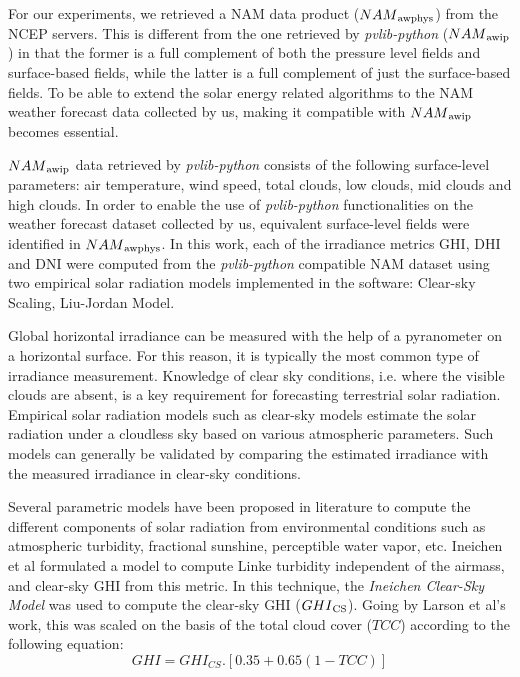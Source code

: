 \par For our experiments, we retrieved a NAM data product ($NAM\textsubscript{awphys}$) from the NCEP servers. This is different from the one retrieved by \textit{pvlib-python} ($NAM\textsubscript{awip}$) in that the former is a full complement of both the pressure level fields and surface-based fields, while the latter is a full complement of just the surface-based fields. To be able to extend the solar energy related algorithms to the NAM weather forecast data collected by us, making it compatible with $NAM\textsubscript{awip}$ becomes essential.

\par $NAM\textsubscript{awip}$ data retrieved by \textit{pvlib-python} consists of the following surface-level parameters: air temperature, wind speed, total clouds, low clouds, mid clouds and high clouds. In order to enable the use of \textit{pvlib-python} functionalities on the weather forecast dataset collected by us, equivalent surface-level fields were identified in $NAM\textsubscript{awphys}$. In this work, each of the irradiance metrics GHI, DHI and DNI were computed from the \textit{pvlib-python} compatible NAM dataset using two empirical solar radiation models implemented in the software: Clear-sky Scaling, Liu-Jordan Model.
\vspace{0.3cm}

\par Global horizontal irradiance can be measured with the help of a pyranometer on a horizontal surface. For this reason, it is typically the most common type of irradiance measurement. Knowledge of clear sky conditions, i.e. where the visible clouds are absent, is a key requirement for forecasting terrestrial solar radiation. Empirical solar radiation models such as clear-sky models estimate the solar radiation under a cloudless sky based on various atmospheric parameters. Such models can generally be validated by comparing the estimated irradiance with the measured irradiance in clear-sky conditions. 

\par Several parametric models have been proposed in literature to compute the different components of solar radiation from environmental conditions such as atmospheric turbidity, fractional sunshine, perceptible water vapor, etc. Ineichen et al \cite{pvlib_ineichen} formulated a model to compute Linke turbidity independent of the airmass, and clear-sky GHI from this metric. In this technique, the \textit{Ineichen Clear-Sky Model} was used to compute the clear-sky GHI ($GHI\textsubscript{CS}$). Going by Larson et al's \cite{pvlib_larson} work, this was scaled on the basis of the total cloud cover ($TCC$) according to the following equation: 
\begin{equation}\label{eq:ghi_cs}
    GHI = GHI_{CS} . [0.35 + 0.65(1 - TCC)]
\end{equation}

